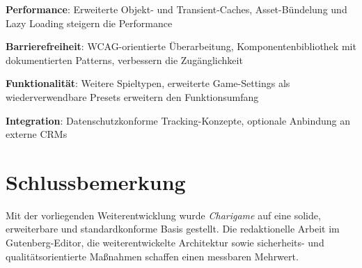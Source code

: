 \textbf{Performance}: Erweiterte Objekt- und Transient-Caches, Asset-Bündelung und Lazy Loading steigern die Performance

\textbf{Barrierefreiheit}: WCAG-orientierte Überarbeitung, Komponentenbibliothek mit dokumentierten Patterns, verbessern die Zugänglichkeit

\textbf{Funktionalität}: Weitere Spieltypen, erweiterte Game-Settings als wiederverwendbare Presets erweitern den Funktionsumfang

\textbf{Integration}: Datenschutzkonforme Tracking-Konzepte, optionale Anbindung an externe CRMs

\section{Schlussbemerkung}
Mit der vorliegenden Weiterentwicklung wurde \textit{Charigame} auf eine solide, erweiterbare und standardkonforme Basis gestellt.
Die redaktionelle Arbeit im Gutenberg-Editor, die weiterentwickelte Architektur sowie sicherheits- und qualitätsorientierte Maßnahmen schaffen einen messbaren Mehrwert.

